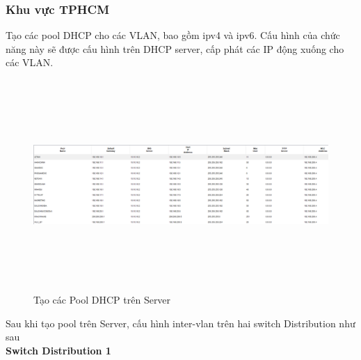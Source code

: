 \documentclass[12pt,a4paper]{report}
\begin{document}
\subsubsection{Khu vực TPHCM}
\hspace*{0.25cm}Tạo các pool DHCP cho các VLAN, bao gồm ipv4 và ipv6. Cấu hình của chức năng này sẽ được cấu hình trên DHCP server, cấp phát các IP động xuống cho các VLAN.\\
\begin{figure}[H]
    \centering
    \includegraphics[width=16cm, height=8cm]{img/471.png}
    \caption{Tạo các Pool DHCP trên Server}
    \label{hinh471}
\end{figure}
\hspace*{0.25cm}Sau khi tạo pool trên Server, cấu hình inter-vlan trên hai switch Distribution như sau\\
\hspace*{1cm}\textbf{Switch Distribution 1}\\
\end{document}

